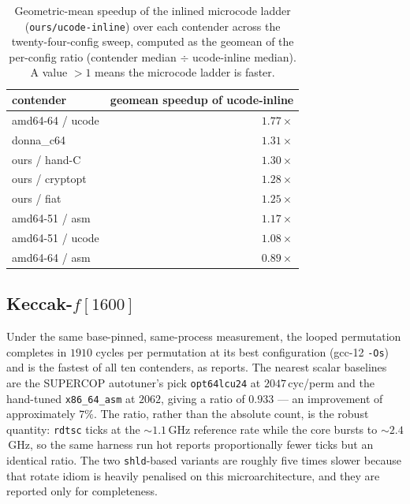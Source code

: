 \begin{table}[t]
\centering
\caption{Geometric-mean speedup of the inlined microcode ladder
(\texttt{ours/ucode-inline}) over each contender across the twenty-four-config
sweep, computed as the geomean of the per-config ratio (contender median $\div$
ucode-inline median). A value $>1$ means the microcode ladder is faster.}
\label{tab:res-c25519-ratio}
\small
\begin{tabular}{@{}lr@{}}
\toprule
contender & geomean speedup of ucode-inline \\
\midrule
amd64-64 / ucode  & $1.77\times$ \\
donna\_c64        & $1.31\times$ \\
ours / hand-C     & $1.30\times$ \\
ours / cryptopt   & $1.28\times$ \\
ours / fiat       & $1.25\times$ \\
amd64-51 / asm    & $1.17\times$ \\
amd64-51 / ucode  & $1.08\times$ \\
amd64-64 / asm    & $0.89\times$ \\
\bottomrule
\end{tabular}
\end{table}

\subsection{Keccak-$f[1600]$}
\label{sec:res-keccak}

Under the same base-pinned, same-process measurement, the looped permutation
completes in $1910$ cycles per permutation at its best configuration (gcc-12
\texttt{-Os}) and is the fastest of all ten contenders, as
 reports. The nearest scalar baselines are the SUPERCOP
autotuner's pick \texttt{opt64lcu24} at $2047$\,cyc/perm and the hand-tuned
\texttt{x86\_64\_asm} at $2062$, giving a ratio of $0.933$ --- an improvement of
approximately $7\%$. The ratio, rather than the absolute count, is the robust
quantity: \texttt{rdtsc} ticks at the $\sim\!1.1$\,GHz reference rate while the
core bursts to $\sim\!2.4$\,GHz, so the same harness run hot reports
proportionally fewer ticks but an identical ratio. The two \texttt{shld}-based
variants are roughly five times slower because that rotate idiom is heavily
penalised on this microarchitecture, and they are reported only for completeness.

